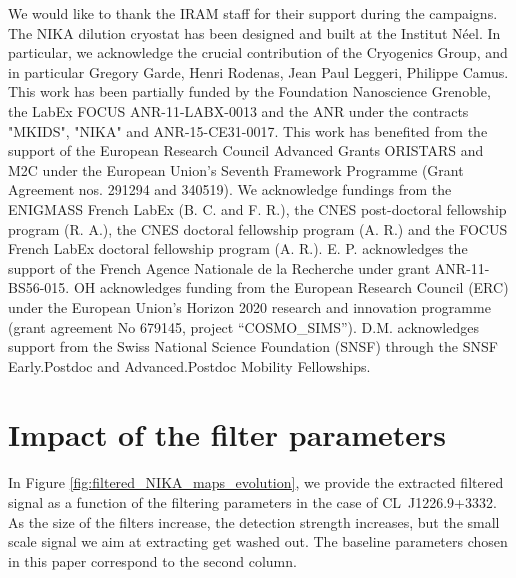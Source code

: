 \documentclass[twocolumn,traditabstract]{aa}
\begin{document}
\begin{acknowledgements}
We would like to thank the IRAM staff for their support during the campaigns. 
The NIKA dilution cryostat has been designed and built at the Institut N\'eel. In particular, we acknowledge the crucial contribution of the Cryogenics Group, and  in particular Gregory Garde, Henri Rodenas, Jean Paul Leggeri, Philippe Camus. 
This work has been partially funded by the Foundation Nanoscience Grenoble, the LabEx FOCUS ANR-11-LABX-0013 and the ANR under the contracts "MKIDS", "NIKA" and ANR-15-CE31-0017. 
This work has benefited from the support of the European Research Council Advanced Grants ORISTARS and M2C under the European Union's Seventh Framework Programme (Grant Agreement nos. 291294 and 340519).
We acknowledge fundings from the ENIGMASS French LabEx (B. C. and F. R.), the CNES post-doctoral fellowship program (R. A.),  the CNES doctoral fellowship program (A. R.) and the FOCUS French LabEx doctoral fellowship program (A. R.).
E. P. acknowledges the support of the French Agence Nationale de la Recherche under grant ANR-11-BS56-015.
OH acknowledges funding from the European Research Council (ERC) under the European Union's Horizon 2020 research and innovation programme (grant agreement No 679145, project “COSMO\_SIMS”).
D.M. acknowledges support from the Swiss National Science Foundation (SNSF) through the SNSF Early.Postdoc and Advanced.Postdoc Mobility Fellowships. 
\end{acknowledgements}



\appendix
\section{Impact of the filter parameters}\label{sec:Impact_of_the_filter_parameters}
In Figure \ref{fig:filtered_NIKA_maps_evolution}, we provide the extracted filtered signal as a function of the filtering parameters in the case of \mbox{CL~J1226.9+3332}. As the size of the filters increase, the detection strength increases, but the small scale signal we aim at extracting get washed out. The baseline parameters chosen in this paper correspond to the second column.
\end{document}
